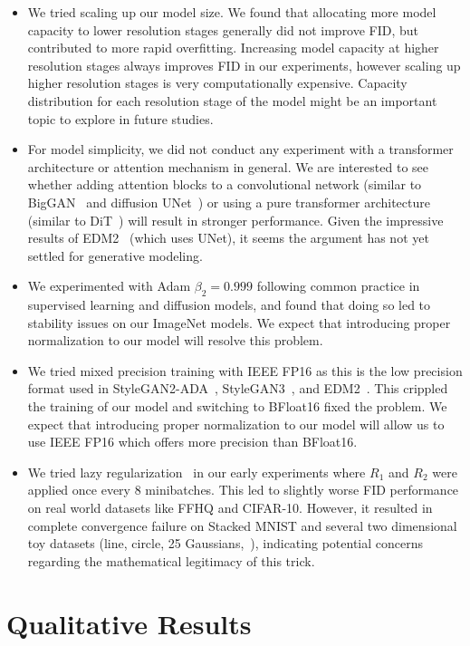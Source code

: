\begin{itemize}
    \item We tried scaling up our model size. We found that allocating more model capacity to lower resolution stages generally did not improve FID, but contributed to more rapid overfitting. Increasing model capacity at higher resolution stages always improves FID in our experiments, however scaling up higher resolution stages is very computationally expensive. Capacity distribution for each resolution stage of the model might be an important topic to explore in future studies.
    \item For model simplicity, we did not conduct any experiment with a transformer architecture or attention mechanism in general. We are interested to see whether adding attention blocks to a convolutional network (similar to BigGAN~\cite{biggan} and diffusion UNet~\cite{ddpm,edm,edm2}) or using a pure transformer architecture (similar to DiT~\cite{dit}) will result in stronger performance. Given the impressive results of EDM2~\cite{edm2} (which uses UNet), it seems the argument has not yet settled for generative modeling.
    \item We experimented with Adam $\beta_2=0.999$ following common practice in supervised learning and diffusion models, and found that doing so led to stability issues on our ImageNet models. We expect that introducing proper normalization to our model will resolve this problem.
    \item We tried mixed precision training with IEEE FP16 as this is the low precision format used in StyleGAN2-ADA~\cite{sg2ada}, StyleGAN3~\cite{sg3}, and EDM2~\cite{edm2}. This crippled the training of our model and switching to BFloat16 fixed the problem. We expect that introducing proper normalization to our model will allow us to use IEEE FP16 which offers more precision than BFloat16.
    \item We tried lazy regularization~\cite{sg2} in our early experiments where $R_1$ and $R_2$ were applied once every 8 minibatches. This led to slightly worse FID performance on real world datasets like FFHQ and CIFAR-10. However, it resulted in complete convergence failure on Stacked MNIST and several two dimensional toy datasets (line, circle, 25 Gaussians,~\etc), indicating potential concerns regarding the mathematical legitimacy of this trick.
\end{itemize}
\newpage
\section{Qualitative Results}

